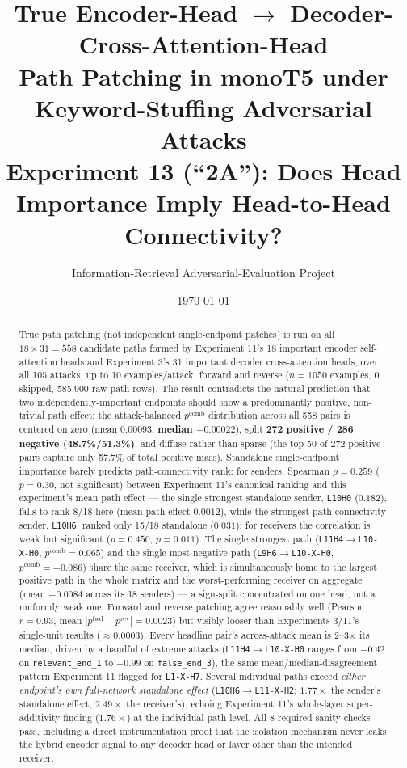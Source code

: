 \documentclass[11pt]{article}
\title{\textbf{True Encoder-Head $\to$ Decoder-Cross-Attention-Head \\[2pt]
Path Patching in monoT5 under Keyword-Stuffing Adversarial Attacks} \\[6pt]
\large Experiment 13 (``2A''): Does Head Importance Imply Head-to-Head Connectivity?}
\author{Information-Retrieval Adversarial-Evaluation Project}
\date{\today}
\newcommand{\pfwd}{\ensuremath{p^{\mathrm{fwd}}}}
\newcommand{\prev}{\ensuremath{p^{\mathrm{rev}}}}
\newcommand{\pcomb}{\ensuremath{p^{\mathrm{comb}}}}
\begin{document}
\maketitle

\begin{abstract}
True path patching (not independent single-endpoint patches) is run on all
$18 \times 31 = 558$ candidate paths formed by Experiment 11's 18 important
encoder self-attention heads and Experiment 3's 31 important decoder
cross-attention heads, over all 105 attacks, up to 10 examples/attack, forward
and reverse ($n{=}1050$ examples, 0 skipped, 585{,}900 raw path rows). The
result contradicts the natural prediction that two independently-important
endpoints should show a predominantly positive, non-trivial path effect: the
attack-balanced $\pcomb$ distribution across all 558 pairs is centered on
zero (mean $0.00093$, \textbf{median $-0.00022$}), split
\textbf{272 positive / 286 negative (48.7\%/51.3\%)}, and diffuse rather than
sparse (the top 50 of 272 positive pairs capture only 57.7\% of total positive
mass). Standalone single-endpoint importance barely predicts path-connectivity
rank: for senders, Spearman $\rho{=}0.259$ ($p{=}0.30$, not significant) between
Experiment 11's canonical ranking and this experiment's mean path effect —
the single strongest standalone sender, \texttt{L10H0} ($0.182$), falls to
rank 8/18 here (mean path effect $0.0012$), while the strongest path-connectivity
sender, \texttt{L10H6}, ranked only 15/18 standalone ($0.031$); for receivers the
correlation is weak but significant ($\rho{=}0.450$, $p{=}0.011$). The single
strongest path (\texttt{L11H4}$\to$\texttt{L10-X-H0}, $\pcomb{=}0.065$) and the
single most negative path (\texttt{L9H6}$\to$\texttt{L10-X-H0}, $\pcomb{=}-0.086$)
share the same receiver, which is simultaneously home to the largest positive
path in the whole matrix and the worst-performing receiver on aggregate
(mean $-0.0084$ across its 18 senders) — a sign-split concentrated on one
head, not a uniformly weak one. Forward and reverse patching agree
reasonably well (Pearson $r{=}0.93$, mean $|\pfwd-\prev|{=}0.0023$) but
visibly looser than Experiments 3/11's single-unit results
($\approx 0.0003$). Every headline pair's across-attack mean is 2--3$\times$
its median, driven by a handful of extreme attacks
(\texttt{L11H4}$\to$\texttt{L10-X-H0} ranges from $-0.42$ on
\texttt{relevant\_end\_1} to $+0.99$ on \texttt{false\_end\_3}), the same
mean/median-disagreement pattern Experiment 11 flagged for \texttt{L1-X-H7}.
Several individual paths exceed \emph{either endpoint's own full-network
standalone effect} (\texttt{L10H6}$\to$\texttt{L11-X-H2}: $1.77\times$ the
sender's standalone effect, $2.49\times$ the receiver's), echoing Experiment
11's whole-layer super-additivity finding ($1.76\times$) at the individual-path
level. All 8 required sanity checks pass, including a direct instrumentation
proof that the isolation mechanism never leaks the hybrid encoder signal to
any decoder head or layer other than the intended receiver.
\end{abstract}
\end{document}
